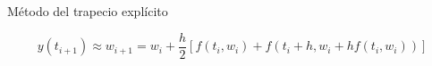 		\begin{frame}{Método del trapecio explícito}
			\fontsize{11}{11}\selectfont		

			\begin{equation} \label{eq:app-exp}
				y(t_{i+1}) \approx w_{i+1} = w_i + \frac{h}{2} \left[f(t_i,w_i) + f(t_{i}+h, w_i + h f(t_i,w_i))\right]
			\end{equation}
			
		\end{frame}
